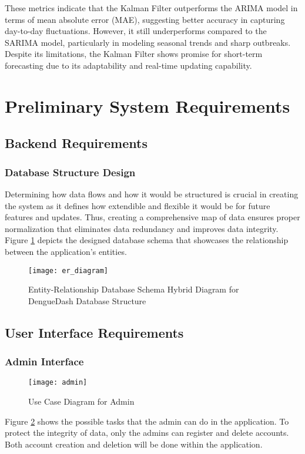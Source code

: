 These metrics indicate that the Kalman Filter outperforms the ARIMA model in terms of mean absolute error (MAE), suggesting better accuracy in capturing day-to-day fluctuations. However, it still underperforms compared to the SARIMA model, particularly in modeling seasonal trends and sharp outbreaks. Despite its limitations, the Kalman Filter shows promise for short-term forecasting due to its adaptability and real-time updating capability.


\clearpage
\section{Preliminary System Requirements}
\subsection{Backend Requirements}
\subsubsection{Database Structure Design}
Determining how data flows and how it would be structured is crucial in creating the system as it defines how extendible and flexible it would be for future features and updates. Thus, creating a comprehensive map of data ensures proper normalization that eliminates data redundancy and improves data integrity. Figure \ref{fig:er_diagram} depicts the designed database schema that showcases the relationship between the application's entities. 
\begin{figure}[H]
	\centering
	\texttt{[image: er\_diagram]}
	\caption{Entity-Relationship Database Schema Hybrid Diagram for DengueDash Database Structure}
	\label{fig:er_diagram}
\end{figure}

\subsection{User Interface Requirements}
\subsubsection{Admin Interface}
\begin{figure}[H]
	\centering
	\texttt{[image: admin]}
	\caption{Use Case Diagram for Admin}
	\label{fig:admin-use-case}
\end{figure}
Figure \ref{fig:admin-use-case} shows the possible tasks that the admin can do in the application. To protect the integrity of data, only the admins can register and delete accounts. Both account creation and deletion will be done within the application.

